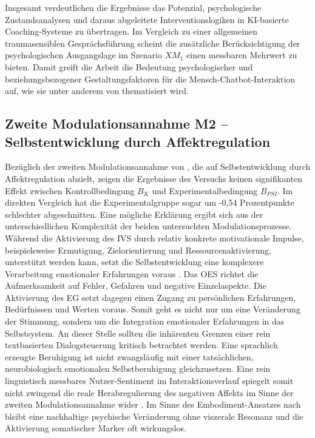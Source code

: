 Insgesamt verdeutlichen die Ergebnisse das Potenzial, psychologische Zustandsanalysen und daraus abgeleitete Interventionslogiken in KI-basierte Coaching-Systeme zu übertragen. Im Vergleich zu einer allgemeinen traumasensiblen Gesprächsführung scheint die zusätzliche Berücksichtigung der psychologischen Ausgangslage im Szenario $XM_1$ einen messbaren Mehrwert zu bieten. Damit greift die Arbeit die Bedeutung psychologischer und beziehungsbezogener Gestaltungsfaktoren für die Mensch-Chatbot-Interaktion auf, wie sie unter anderem von \cite{mai2020ai} thematisiert wird.

\subsection{Zweite Modulationsannahme M2 – Selbstentwicklung durch Affektregulation}
Bezüglich der zweiten Modulationsannahme von \cite{Kuhl2000The}, die auf Selbstentwicklung durch Affektregulation abzielt, zeigen die Ergebnisse des Versuchs keinen signifikanten Effekt zwischen Kontrollbedingung $B_K$ und Experimentalbedingung $B_{PSI}$. Im direkten Vergleich hat die Experimentalgruppe sogar um -0,54 Prozentpunkte schlechter abgeschnitten. 
Eine mögliche Erklärung ergibt sich aus der unterschiedlichen Komplexität der beiden untersuchten Modulationsprozesse. Während die Aktivierung des IVS durch relativ konkrete motivationale Impulse, beispielsweise Ermutigung, Zielorientierung und Ressourcenaktivierung, unterstützt werden kann, setzt die Selbstentwicklung eine komplexere Verarbeitung emotionaler Erfahrungen voraus \citep{kuhl2005neue}. Das OES richtet die Aufmerksamkeit auf Fehler, Gefahren und negative Einzelaspekte. Die Aktivierung des EG setzt dagegen einen Zugang zu persönlichen Erfahrungen, Bedürfnissen und Werten voraus. Somit geht es nicht nur um eine Veränderung der Stimmung, sondern um die Integration emotionaler Erfahrungen in das Selbstsystem.
An dieser Stelle sollten die inhärenten Grenzen einer rein textbasierten Dialogsteuerung kritisch betrachtet werden. Eine sprachlich erzeugte Beruhigung ist nicht zwangsläufig mit einer tatsächlichen, neurobiologisch emotionalen Selbstberuhigung gleichzusetzen. Eine rein linguistisch messbares Nutzer-Sentiment im Interaktionsverlauf spiegelt somit nicht zwingend die reale Herabregulierung des negativen Affekts im Sinne der zweiten Modulationsannahme wider \citep{Kuhl2000The}. Im Sinne des Embodiment-Ansatzes nach \cite{tschacher2012bedeutung} bleibt eine nachhaltige psychische Veränderung ohne viszerale Resonanz und die Aktivierung somatischer Marker oft wirkungslos. 
